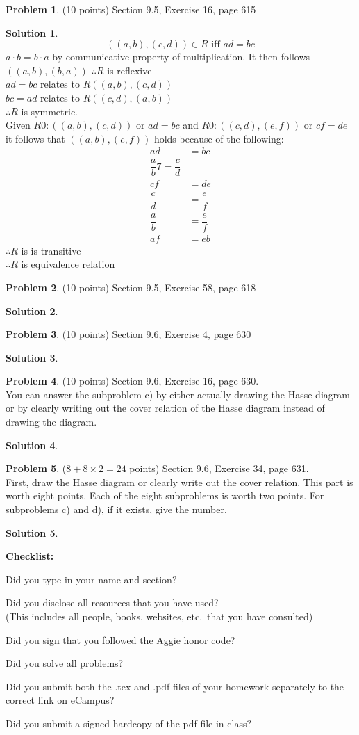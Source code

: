 \documentclass{article}
\theoremstyle{definition}
\newtheorem{problem}{Problem}
\newtheorem*{solution}{Solution}
\newcommand{\checklist}{\noindent\textbf{Checklist:}
\begin{compactitem}[$\Box$] 
\item Did you type in your name and section? 
\item Did you disclose all resources that you have used? \\
(This includes all people, books, websites, etc.\ that you have consulted)
\item Did you sign that you followed the Aggie honor code? 
\item Did you solve all problems? 
\item Did you submit both the .tex and .pdf files of your homework separately 
to the correct link on eCampus?
\item Did you submit a signed hardcopy of the pdf file in class? 
\end{compactitem}
}
\begin{document}
\begin{problem} (10 points)
Section 9.5, Exercise 16, page 615
\end{problem}
\begin{solution} 
  $$ ((a, b), (c, d) ) \in R \text{ iff } ad = bc$$
  $a \cdot b = b \cdot a$ by communicative property of multiplication. It then follows $( (a,b), (b,a))$ $\therefore R$ is reflexive  \\
  $ad = bc$ relates to $R((a,b),(c,d))$ \\
  $bc = ad$ relates to $R((c,d),(a,b))$ \\
  $\therefore R$ is symmetric. \\
  Given $R0: ((a,b),(c,d))$ or $ad = bc$ and $R0: ((c,d),(e,f))$ or $cf=de$ it follows that $((a,b),(e,f))$ holds because of the following:
  \begin{align*}
    ad &= bc \\
    \dfrac{a}{b} 7= \dfrac{c}{d} \\
    cf &= de \\
    \dfrac{c}{d} &= \dfrac{e}{f} \\
    \dfrac{a}{b} &= \dfrac{e}{f} \\
    af &= eb
  \end{align*}
  $\therefore R$ is is transitive \\
  $\therefore R$ is equivalence relation  
\end{solution}

\begin{problem} (10 points)
Section 9.5, Exercise 58, page 618
\end{problem}
\begin{solution} 
\end{solution}

\begin{problem} (10 points)
Section 9.6, Exercise 4, page 630
\end{problem}
\begin{solution} 
\end{solution}

\begin{problem} (10 points)
Section 9.6, Exercise 16, page 630.
\ \\
You can answer the subproblem c) by either actually drawing the Hasse diagram 
or by clearly writing out the cover relation of the Hasse diagram instead of 
drawing the diagram.
\end{problem}
\begin{solution} 
\end{solution}

\begin{problem} ($8+8\times 2 = 24$ points)
Section 9.6, Exercise 34, page 631.
\ \\ 
First, draw the Hasse diagram or clearly write out the cover relation.  This
part is worth eight points.  Each of the eight subproblems is worth two points.
For subproblems c) and d), if it exists, give the number.
\end{problem}
\begin{solution} 
\end{solution}

\goodbreak
\checklist
\end{document}
